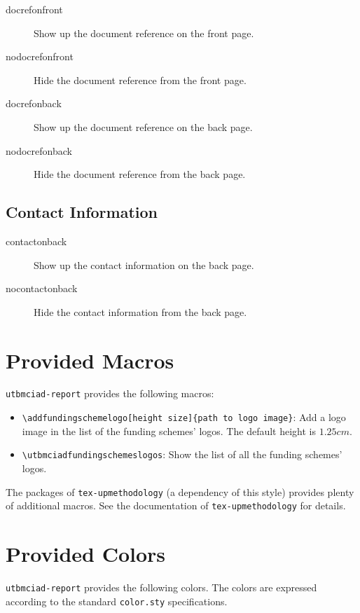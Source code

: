 \documentclass[article,nodocrefonfront,nodocrefonback]{utbmciadreport}
\begin{document}
\begin{description}
\item[docrefonfront] Show up the document reference on the front page.
\item[nodocrefonfront] Hide the document reference from the front page.
\item[docrefonback] Show up the document reference on the back page.
\item[nodocrefonback] Hide the document reference from the back page.
\end{description}

\subsection{Contact Information}

\begin{description}
\item[contactonback] Show up the contact information on the back page.
\item[nocontactonback] Hide the contact information from the back page.
\end{description}

\section{Provided Macros}

\texttt{utbmciad-report} provides the following macros:
\begin{itemize}
\item \texttt{{\textbackslash}addfundingschemelogo[height size]\{path to logo image\}}: Add a logo image in the list of the funding schemes' logos. The default height is $1.25cm$.
\item \texttt{{\textbackslash}utbmciadfundingschemeslogos}: Show the list of all the funding schemes' logos.
\end{itemize}

The packages of \texttt{tex-upmethodology} (a dependency of this style) provides plenty of additional macros. See the documentation of \texttt{tex-upmethodology} for details.

\section{Provided Colors}

\texttt{utbmciad-report} provides the following colors. The colors are expressed according to the standard \texttt{color.sty} specifications.
\end{document}
